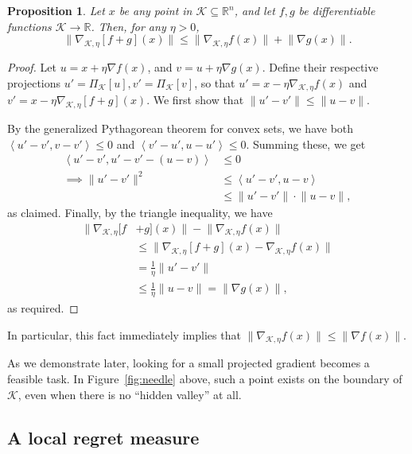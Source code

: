 \documentclass{article}
\def\norm#1{\mathopen\| #1 \mathclose\|}
\newcommand{\K}{\ensuremath{\mathcal K}}
\newcommand{\ang}[1]{\left<#1\right>}
\newcommand{\bra}[1]{\left[#1\right]}
\newcommand{\R}{\mathbb{R}}
\newtheorem{proposition}[theorem]{Proposition}
\renewcommand{\K}{\mathcal{K}}
\begin{document}
\begin{proposition}
\label{projection-is-lipschitz}
Let $x$ be any point in $\K \subseteq \R^n$, and let $f,g$ be differentiable functions $\K \rightarrow \R$. Then, for any $\eta > 0$,
\[ \norm{\nabla_{\K,\eta} [f + g](x)} \leq \norm{\nabla_{\K,\eta} f(x)} + \norm{\nabla g(x)}. \]
\end{proposition}
\begin{proof}
Let $u = x + \eta \nabla f(x)$, and $v = u + \eta \nabla g(x)$. Define their respective projections $u' = \Pi_\K\bra{u}, v' = \Pi_\K\bra{v}$, so that $u' = x - \eta \nabla_{\K,\eta} f(x)$ and $v' = x - \eta \nabla_{\K,\eta} [f + g](x)$. We first show that $\norm{u' - v'} \leq \norm{u - v}$.

By the generalized Pythagorean theorem for convex sets, we have both $\ang{u' - v', v - v'} \leq 0$ and
$\ang{v' - u', u - u'} \leq 0$.
Summing these, we get
\begin{align*}
\ang{u' - v', u' - v' - (u - v)} &\leq 0 \\
\implies \norm{u' - v'}^2 &\leq \ang{u' - v', u - v}\\
&\leq \norm{u'-v'} \cdot \norm{u-v},
\end{align*}
as claimed.
Finally, by the triangle inequality, we have
\begin{align*}
\norm{\nabla_{\K,\eta} [f &+ g](x)} - \norm{\nabla_{\K,\eta} f(x)} \\
&\leq \norm{\nabla_{\K,\eta} [f + g](x) - \nabla_{\K,\eta} f(x)}\\
&= \frac{1}{\eta} \norm{u'-v'} \\
& \leq \frac{1}{\eta} \norm{u-v} = \norm{\nabla g(x)},
\end{align*}
as required.

\end{proof}
In particular, this fact immediately implies that $\norm{ \nabla_{\K, \eta} f(x) } \leq \norm{ \nabla f(x) }$.

As we demonstrate later, looking for a small projected gradient becomes a feasible task. In Figure~\ref{fig:needle} above, such a point exists on the boundary of $\K$, even when there is no ``hidden valley'' at all.

\subsection{A local regret measure}
\label{subsection:regret-measure}
\end{document}
